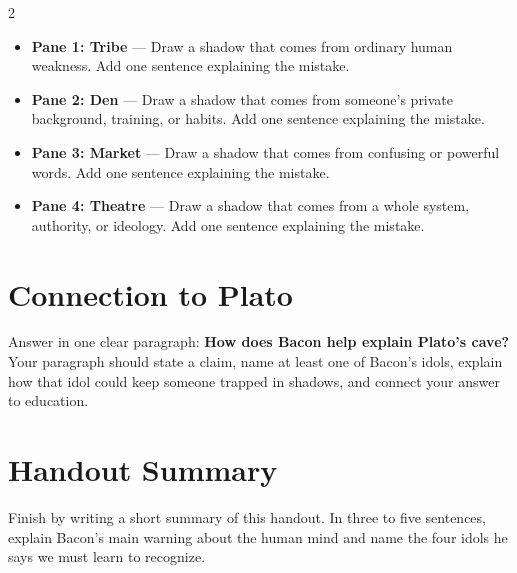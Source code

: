 \documentclass[12pt]{article}
\begin{document}
\begin{multicols}{2}
\begin{itemize}[leftmargin=*, itemsep=0.2em]
\item \textbf{Pane 1: Tribe} --- Draw a shadow that comes from ordinary human weakness. Add one sentence explaining the mistake.
\item \textbf{Pane 2: Den} --- Draw a shadow that comes from someone's private background, training, or habits. Add one sentence explaining the mistake.
\item \textbf{Pane 3: Market} --- Draw a shadow that comes from confusing or powerful words. Add one sentence explaining the mistake.
\item \textbf{Pane 4: Theatre} --- Draw a shadow that comes from a whole system, authority, or ideology. Add one sentence explaining the mistake.
\end{itemize}

\section*{Connection to Plato}
Answer in one clear paragraph: \textbf{How does Bacon help explain Plato's cave?} Your paragraph should state a claim, name at least one of Bacon's idols, explain how that idol could keep someone trapped in shadows, and connect your answer to education.

\section*{Handout Summary}
Finish by writing a short summary of this handout. In three to five sentences, explain Bacon's main warning about the human mind and name the four idols he says we must learn to recognize.

\end{multicols}
\end{document}
